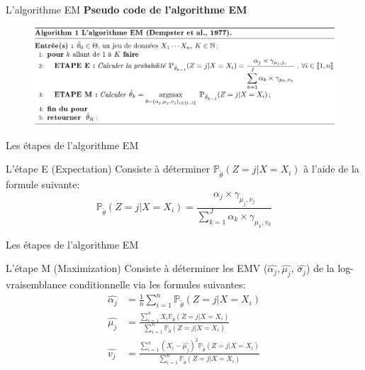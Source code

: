 \documentclass[11pt]{beamer}
\begin{document}
	\begin{frame}{L'algorithme EM}
		\textbf{Pseudo code de l'algorithme EM}
		\begin{figure}[H]
			\centering
			\includegraphics[scale=0.6]{images/pseudo_code.png}
		\end{figure}
	\end{frame}
	\begin{frame}{Les étapes de l'algorithme EM}
		\begin{block}{L'étape E (Expectation)}
			Consiste à déterminer $\mathbb{P}_{\tilde{\theta}}(Z = j | X = X_i)$ à l'aide de la formule suivante:
			\[
				\mathbb{P}_{\tilde{\theta}}(Z = j| X = X_i) = \frac{\alpha_j \times \gamma_{\mu_j, v_j}}{\sum_{k=1}^{J} \alpha_k \times \gamma_{\mu_k, v_k}}
			\]
		\end{block}
	\end{frame}
	\begin{frame}{Les étapes de l'algorithme EM}
		\begin{block}{L'étape M (Maximization)}
			Consiste à déterminer les EMV ($\widehat{\alpha_j}, \widehat{\mu_j}$, $\widehat{\sigma_j}$) de la log-vraisemblance conditionnelle via les formules suivantes:
			\begin{align*}
				\widehat{\alpha_j} &= \frac{1}{n}\sum_{i=1}^n \mathbb{P}_{\tilde{\theta}}(Z = j| X = X_i) \\
				\widehat{\mu_j} &= \frac{\sum_{i=1}^n X_i\mathbb{P}_{\tilde{\theta}}(Z = j| X = X_i)}{\sum_{i=1}^n \mathbb{P}_{\tilde{\theta}}(Z = j| X = X_i)} \\
				\widehat{v_j} &= \frac{\sum_{i=1}^n (X_i -\widehat{\mu_j})^2 \mathbb{P}_{\tilde{\theta}}(Z = j| X = X_i)}{\sum_{i=1}^n\mathbb{P}_{\tilde{\theta}}(Z = j| X = X_i)}
			\end{align*}
		\end{block}
	\end{frame}
\end{document}
